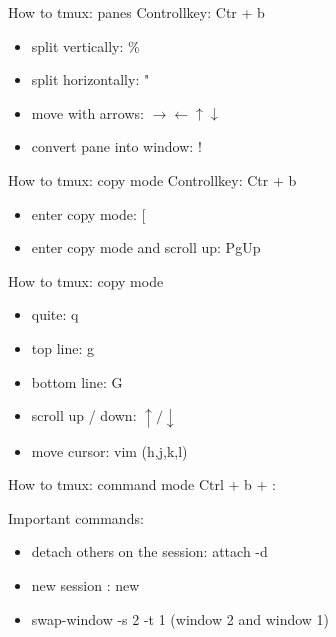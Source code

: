 \documentclass[10pt,graphics,aspectratio=169,table]{beamer}
\begin{document}
\begin{frame}{How to tmux: panes}
    Controllkey: Ctr + b
    \begin{itemize}
        \item split vertically: \%
        \item split horizontally: "
        \item move with arrows: $\rightarrow \leftarrow \uparrow \downarrow$
        \item convert pane into window: !
    \end{itemize}
\end{frame}

\begin{frame}{How to tmux: copy mode}
Controllkey: Ctr + b
\begin{itemize}
    \item enter copy mode: [
    \item enter copy mode and scroll up: PgUp
\end{itemize}
\end{frame}

\begin{frame}{How to tmux: copy mode}
\begin{itemize}
    \item quite: q
    \item top line: g
    \item bottom line: G
    \item scroll up / down: $\uparrow / \downarrow$
    \item move cursor: vim (h,j,k,l)
\end{itemize}
\end{frame}

\begin{frame}{How to tmux: command mode}
Ctrl + b + :

Important commands:
\begin{itemize}
    \item detach others on the session: attach -d
    \item new session : new
    \item swap-window -s 2 -t 1 (window 2 and window 1)
\end{itemize}
    
\end{frame}
\end{document}
